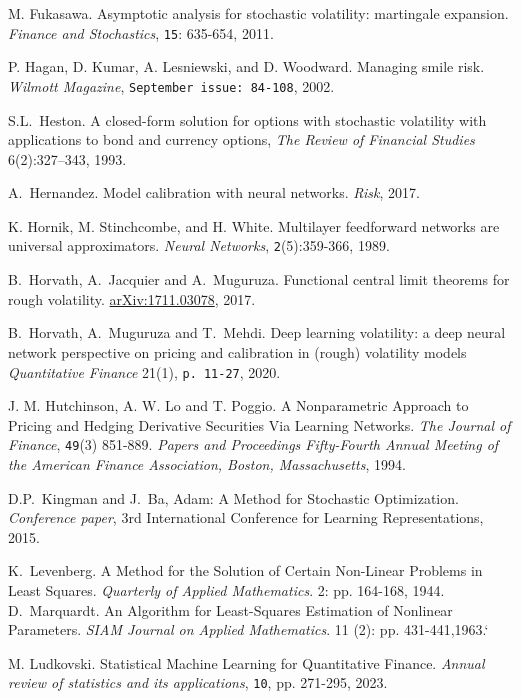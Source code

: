 \documentclass{article}
\theoremstyle{remark}
\begin{document}
\begin{thebibliography}{99}
M. Fukasawa.
Asymptotic analysis for stochastic volatility: martingale expansion.
\textit{Finance and Stochastics}, {\tt 15}: 635-654, 2011.

P. Hagan, D. Kumar, A. Lesniewski, and D. Woodward. Managing smile risk. \textit{Wilmott Magazine}, {\tt September issue: 84-108}, 2002.

S.L.~Heston. A closed-form solution for options with stochastic
  volatility with applications to bond and currency options, \textit{The Review of Financial Studies} 6(2):327--343, 1993.

A.~Hernandez. Model calibration with neural networks. \textit{Risk}, 2017.    

K. Hornik, M. Stinchcombe, and H. White. 
Multilayer feedforward networks are universal approximators. 
\textit{Neural Networks}, {\tt 2}(5):359-366, 1989.

B.~Horvath, A.~Jacquier and A.~Muguruza.
Functional central limit theorems for rough volatility.
\href{https://arxiv.org/abs/1711.03078}{arXiv:1711.03078}, 2017.

B.~Horvath,  A.~Muguruza and T.~Mehdi.
Deep learning volatility: a deep neural network perspective on pricing and calibration in (rough) volatility models
\textit{Quantitative Finance} 21(1), {\tt p. 11-27}, 2020.

J. M. Hutchinson, A. W. Lo and T. Poggio.
A Nonparametric Approach to Pricing and Hedging Derivative Securities Via Learning Networks.
\textit{The Journal of Finance}, {\tt 49}(3) 851-889. \textit{Papers and Proceedings Fifty-Fourth Annual Meeting of the American Finance Association, Boston, Massachusetts}, 1994.

 D.P.~Kingman and J.~Ba, Adam: A Method for Stochastic Optimization. \textit{Conference paper}, 3rd International Conference for Learning Representations, 2015.

 K.~Levenberg. A Method for the Solution of Certain Non-Linear Problems in Least Squares. \textit{Quarterly of Applied Mathematics}. 2: pp. 164-168, 1944.
 D.~Marquardt. An Algorithm for Least-Squares Estimation of Nonlinear Parameters. \textit{SIAM Journal on Applied Mathematics}. 11 (2): pp. 431-441,1963.`

 M. Ludkovski.
Statistical Machine Learning for Quantitative Finance.
\textit{Annual review of statistics and its applications}, {\tt 10}, pp. 271-295, 2023.


\end{thebibliography}
\end{document}

